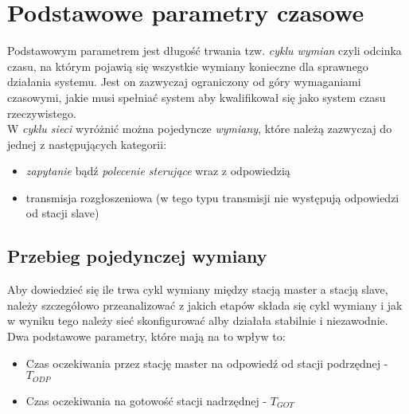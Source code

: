 \section{Podstawowe parametry czasowe}
Podstawowym parametrem jest długość trwania tzw. \textit{cyklu wymian} czyli odcinka czasu, na którym pojawią się wszystkie wymiany konieczne dla sprawnego działania systemu. Jest on zazwyczaj ograniczony od góry wymaganiami czasowymi, jakie musi spełniać system aby kwalifikował się jako system czasu rzeczywistego.\\
W \textit{cyklu sieci} wyróżnić można pojedyncze \textit{wymiany}, które należą zazwyczaj do jednej z następujących kategorii:
\begin{itemize}
	\item \textit{zapytanie} bądź \textit{polecenie sterujące} wraz z odpowiedzią
	\item transmisja rozgłoszeniowa (w tego typu transmisji nie występują odpowiedzi od stacji slave)
\end{itemize}

	\subsection{Przebieg pojedynczej wymiany}
	Aby dowiedzieć się ile trwa cykl wymiany między stacją master a stacją slave, należy szczegółowo przeanalizować z jakich etapów składa się cykl wymiany i jak w wyniku tego należy sieć skonfigurować alby działała stabilnie i niezawodnie. Dwa podstawowe parametry, które mają na to wpływ to:
	\begin{itemize}
		\item Czas oczekiwania przez stację master na odpowiedź od stacji podrzędnej - $ T_{ODP} $
		\item Czas oczekiwania na gotowość stacji nadrzędnej -  $ T_{GOT} $
	\end{itemize}